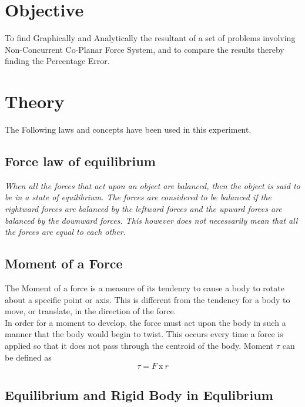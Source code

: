 \documentclass[11pt]{article}
\begin{document}
	
\tableofcontents
\thispagestyle{empty}
\clearpage


\setcounter{page}{1}

\section{Objective}
To find Graphically and Analytically the resultant of a set of problems involving Non-Concurrent Co-Planar Force System, and to compare the results thereby finding the Percentage Error.

\section{Theory}
The Following laws and concepts have been used in this experiment.

\subsection{Force law of equilibrium}
\textit{When all the forces that act upon an object are balanced, then the object is said to be in a state of equilibrium. The forces are considered to be balanced if the rightward forces are balanced by the leftward forces and the upward forces are balanced by the downward forces. This however does not necessarily mean that all the forces are equal to each other.}

\subsection{Moment of a Force}

The Moment of a force is a measure of its tendency to cause a body to rotate about a specific point or axis. This is different from the tendency for a body to move, or translate, in the direction of the force. \\

In order for a moment to develop, the force must act upon the body in such a manner that the body would begin to twist. This occurs every time a force is applied so that it does not pass through the centroid of the body.
Moment $ \tau $ can be defined as
$$\tau=F\ \mathrm{x}\ r$$

\subsection{Equilibrium and Rigid Body in Equlibrium}
\end{document}
